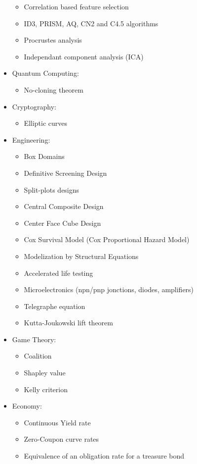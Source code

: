 \begin{itemize}
\begin{itemize}
				\item Correlation based feature selection
				\item ID3, PRISM, AQ, CN2 and C4.5 algorithms
				\item Procrustes analysis
				\item Independant component analysis (ICA)
			\end{itemize}
		\item Quantum Computing: 
			\begin{itemize}
				\item No-cloning theorem
			\end{itemize}
		\item Cryptography: 
			\begin{itemize}
				\item Elliptic curves
			\end{itemize}	
		\item Engineering:
			\begin{itemize}
				\item Box Domains
				\item Definitive Screening Design
				\item Split-plots designs				
				\item Central Composite Design
				\item Center Face Cube Design
				\item Cox Survival Model (Cox Proportional Hazard Model)
				\item Modelization by Structural Equations				
				\item Accelerated life testing
				\item Microelectronics (npn/pnp jonctions, diodes, amplifiers)
				\item Telegraphe equation
				\item Kutta-Joukowski lift theorem
			\end{itemize} 
		\item Game Theory: 
			\begin{itemize}
				\item Coalition
				\item Shapley value
				\item Kelly criterion 
			\end{itemize}
		\item Economy: 
			\begin{itemize}
				\item Continuous Yield rate
				\item Zero-Coupon curve rates
				\item Equivalence of an obligation rate for a treasure bond

\end{itemize}
\end{itemize}
